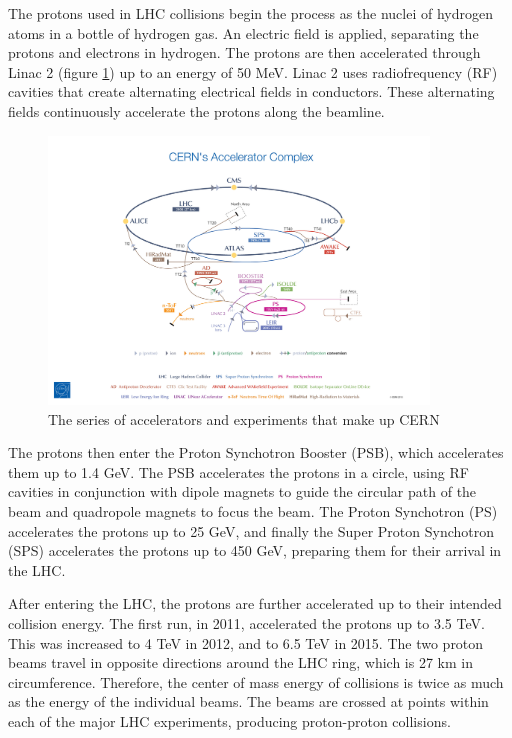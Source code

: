\documentclass[oneside, letterpaper, oldfontcommands]{memoir}
\begin{document}
\qquad The protons used in LHC collisions begin the process as the nuclei of hydrogen atoms in a bottle of hydrogen gas. An electric field is applied, separating the protons and electrons in hydrogen. The protons are then accelerated through Linac 2 (figure \ref{fig:cernacc}) up to an energy of 50 MeV. Linac 2 uses radiofrequency (RF) cavities that create alternating electrical fields in conductors. These alternating fields continuously accelerate the protons along the beamline.

\begin{figure}[here]
\includegraphics[width=0.9\textwidth]{CERN's-accelerator-complex2013.jpg}
\caption{The series of accelerators and experiments that make up CERN \cite{Marcastel:1621583}}
\label{fig:cernacc}
\end{figure}

\qquad The protons then enter the Proton Synchotron Booster (PSB), which accelerates them up to 1.4 GeV. The PSB accelerates the protons in a circle, using RF cavities in conjunction with dipole magnets to guide the circular path of the beam and quadropole magnets to focus the beam. The Proton Synchotron (PS) accelerates the protons up to 25 GeV, and finally the Super Proton Synchotron (SPS) accelerates the protons up to 450 GeV, preparing them for their arrival in the LHC.

\qquad After entering the LHC, the protons are further accelerated up to their intended collision energy. The first run, in 2011, accelerated the protons up to 3.5 TeV. This was increased to 4 TeV in 2012, and to 6.5 TeV in 2015. The two proton beams travel in opposite directions around the LHC ring, which is 27 km in circumference. Therefore, the center of mass energy of collisions is twice as much as the energy of the individual beams. The beams are crossed at points within each of the major LHC experiments, producing proton-proton collisions.
\end{document}
